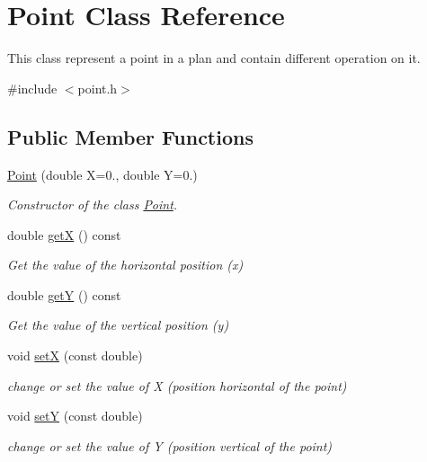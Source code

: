 \hypertarget{class_point}{}\section{Point Class Reference}
\label{class_point}


This class represent a point in a plan and contain different operation on it.  




{\ttfamily \#include $<$point.\+h$>$}

\subsection*{Public Member Functions}
\begin{DoxyCompactItemize}
\item 
\hyperlink{class_point_aafb618df00f36c0bcbec778511f6a3f7}{Point} (double X=0., double Y=0.)
\begin{DoxyCompactList}\small\item\em Constructor of the class \hyperlink{class_point}{Point}. \end{DoxyCompactList}\item 
double \hyperlink{class_point_a655794dd595a4821987664bf1d9010e8}{getX} () const
\begin{DoxyCompactList}\small\item\em Get the value of the horizontal position (x) \end{DoxyCompactList}\item 
double \hyperlink{class_point_aa323a12bec85e28ce6575dccec4f8b28}{getY} () const
\begin{DoxyCompactList}\small\item\em Get the value of the vertical position (y) \end{DoxyCompactList}\item 
void \hyperlink{class_point_a59ad664629f66d7faa5a97c222b11e53}{setX} (const double)
\begin{DoxyCompactList}\small\item\em change or set the value of X (position horizontal of the point) \end{DoxyCompactList}\item 
void \hyperlink{class_point_a62d94bacca48640df1beb272527e0c75}{setY} (const double)
\begin{DoxyCompactList}\small\item\em change or set the value of Y (position vertical of the point) \end{DoxyCompactList}\item 

\end{DoxyCompactItemize}

